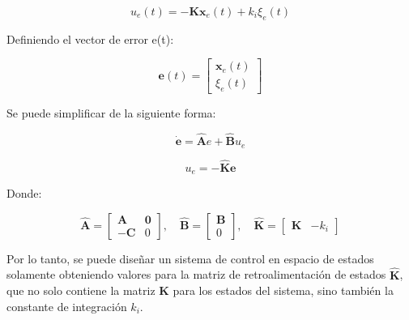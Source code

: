\vspace{-0.5cm}
\begin{equation}
    u_e(t) = -\textbf{K} \textbf{x}_e(t) + k_i \xi_e(t)
\end{equation}

Definiendo el vector de error e(t):

\vspace{-0.5cm}
\begin{equation}
    \textbf{e}(t) = \begin{bmatrix}
        \textbf{x}_e(t) \\
        \xi_e(t)
    \end{bmatrix}
\end{equation}

Se puede simplificar de la siguiente forma:

\vspace{-0.5cm}
\begin{equation}
    \dot{\textbf{e}} = \mathbf{\hat{A}} e + \mathbf{\hat{B}} u_e
    \label{eq:servo_error_Keue}
\end{equation}

\vspace{-0.5cm}

\begin{equation}
    u_e = -\mathbf{\hat{K}e}
    \label{eq:servo_error_Ke}
\end{equation}

Donde:

\vspace{-0.5cm}
\begin{equation}
    \mathbf{\hat{A}} = \begin{bmatrix}
        \textbf{A} & \textbf{0} \\
        -\textbf{C} & 0
    \end{bmatrix}
    , \quad
    \mathbf{\hat{B}} = \begin{bmatrix}
        \textbf{B} \\
        0
    \end{bmatrix}
    , \quad
    \mathbf{\hat{K}} = \begin{bmatrix}
        \textbf{K} & -k_i
    \end{bmatrix}
\end{equation}

Por lo tanto, se puede diseñar un sistema de control en espacio de estados solamente obteniendo valores
para la matriz de retroalimentación de estados $\mathbf{\hat{K}}$, que no solo contiene la matriz \textbf{K}
para los estados del sistema, sino también la constante de integración $k_i$.

